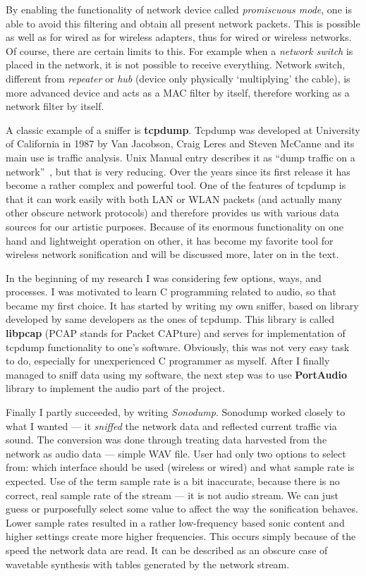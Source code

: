 \documentclass[12pt,a4paper,oneside]{report}
\begin{document}
By enabling the functionality of network device called \emph{promiscuous mode}, one is able to avoid this filtering and obtain all present network packets. This is possible as well as for wired as for wireless adapters, thus for wired or wireless networks. Of course, there are certain limits to this. For example when a \emph{network switch} is placed in the network, it is not possible to receive everything. Network switch, different from \emph{repeater} or \emph{hub} (device only physically `multiplying' the cable), is more advanced device and acts as a MAC filter by itself, therefore working as a network filter by itself.~\cite{Pallavi2012}

A classic example of a sniffer is \textbf{tcpdump}. Tcpdump was developed at University of California in 1987 by Van Jacobson, Craig Leres and Steven McCanne and its main use is traffic analysis. Unix Manual entry describes it as ``dump traffic on a network''~\cite{tcpdump}, but that is very reducing. Over the years since its first release it has become a rather complex and powerful tool. One of the features of tcpdump is that it can work easily with both LAN or WLAN packets (and actually many other obscure network protocols) and therefore provides us with various data sources for our artistic purposes. Because of its enormous functionality on one hand and lightweight operation on other, it has become my favorite tool for wireless network sonification and will be discussed more, later on in the text.

In the beginning of my research I was considering few options, ways, and processes. I was motivated to learn C programming related to audio, so that became my first choice. It has started by writing my own sniffer, based on library developed by same developers as the ones of tcpdump. This library is called \textbf{libpcap} (PCAP stands for Packet CAPture) and serves for implementation of tcpdump functionality to one's software. Obviously, this was not very easy task to do, especially for unexperienced C programmer as myself. After I finally managed to sniff data using my software, the next step was to use \textbf{PortAudio} library to implement the audio part of the project.

Finally I partly succeeded, by writing \emph{Sonodump}. Sonodump worked closely to what I wanted --- it \emph{sniffed} the network data and reflected current traffic via sound. The conversion was done through treating data harvested from the network as audio data --- simple WAV file. User had only two options to select from: which interface should be used (wireless or wired) and what sample rate is expected. Use of the term sample rate is a bit inaccurate, because there is no correct, real sample rate of the stream --- it is not audio stream. We can just guess or purposefully select some value to affect the way the sonification behaves. Lower sample rates resulted in a rather low-frequency based sonic content and higher settings create more higher frequencies. This occurs simply because of the speed the network data are read. It can be described as an obscure case of wavetable synthesis with tables generated by the network stream.
\end{document}

